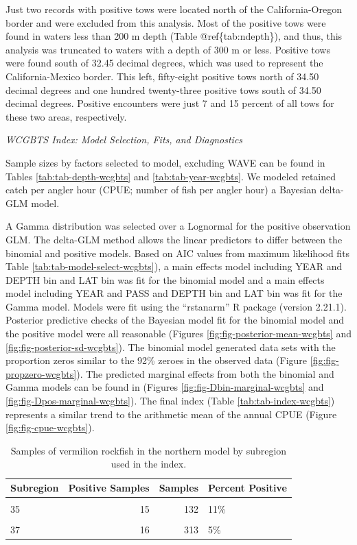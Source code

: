 \documentclass[11pt,
  english,
]{article}
\begin{document}
Just two records with positive tows were located north of the California-Oregon border and were excluded from this analysis. Most of the positive tows were found in waters less than 200 m depth (Table @ref\{tab:ndepth\}), and thus, this analysis was truncated to waters with a depth of 300 m or less. Positive tows were found south of 32.45 decimal degrees, which was used to represent the California-Mexico border. This left, fifty-eight positive tows north of 34.50 decimal degrees and one hundred twenty-three positive tows south of 34.50 decimal degrees. Positive encounters were just 7 and 15 percent of all tows for these two areas, respectively.

\emph{WCGBTS Index: Model Selection, Fits, and Diagnostics}

Sample sizes by factors selected to model, excluding WAVE can be found in Tables \ref{tab:tab-depth-wcgbts} and \ref{tab:tab-year-wcgbts}. We modeled retained catch per angler hour (CPUE; number of fish per angler hour) a Bayesian delta-GLM model.

A Gamma distribution was selected over a Lognormal for the positive observation GLM. The delta-GLM method allows the linear predictors to differ between the binomial and positive models. Based on AIC values from maximum likelihood fits Table \ref{tab:tab-model-select-wcgbts}), a main effects model including YEAR and DEPTH bin and LAT bin was fit for the binomial model and a main effects model including YEAR and PASS and DEPTH bin and LAT bin was fit for the Gamma model. Models were fit using the ``rstanarm'' R package (version 2.21.1). Posterior predictive checks of the Bayesian model fit for the binomial model and the positive model were all reasonable (Figures \ref{fig:fig-posterior-mean-wcgbts} and \ref{fig:fig-posterior-sd-wcgbts}). The binomial model generated data sets with the proportion zeros similar to the 92\% zeroes in the observed data (Figure \ref{fig:fig-propzero-wcgbts}). The predicted marginal effects from both the binomial and Gamma models can be found in (Figures \ref{fig:fig-Dbin-marginal-wcgbts} and \ref{fig:fig-Dpos-marginal-wcgbts}). The final index (Table \ref{tab:tab-index-wcgbts}) represents a similar trend to the arithmetic mean of the annual CPUE (Figure \ref{fig:fig-cpue-wcgbts}).

\newpage

\begin{table}

\caption{\label{tab:tab-region-wcgbts}Samples of vermilion rockfish in the northern model by subregion used in the index.}
\centering
\begin{tabular}[t]{lrrl}
\toprule
Subregion & Positive Samples & Samples & Percent Positive\\
\midrule
\cellcolor{gray!6}{34} & \cellcolor{gray!6}{12} & \cellcolor{gray!6}{125} & \cellcolor{gray!6}{10\%}\\
35 & 15 & 132 & 11\%\\
\cellcolor{gray!6}{36} & \cellcolor{gray!6}{13} & \cellcolor{gray!6}{113} & \cellcolor{gray!6}{12\%}\\
37 & 16 & 313 & 5\%\\
\bottomrule
\end{tabular}
\end{table}
\end{document}
